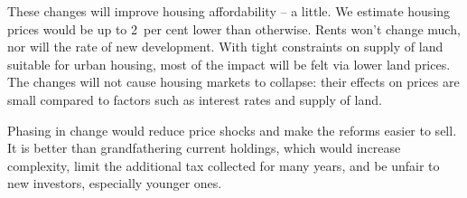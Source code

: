 \begin{overview}[-4\baselineskip]
These changes will improve housing affordability -- a little. We estimate housing prices would be up to 2~per cent lower than otherwise. Rents won't change much, nor will the rate of new development.  With tight constraints on supply of land suitable for urban housing, most of the impact will be felt via lower land prices. The changes will not cause housing markets to collapse: their effects on prices are small compared to factors such as interest rates and supply of land.

Phasing in change would reduce price shocks and make the reforms easier to sell. It is better than grandfathering current holdings, which would increase complexity, limit the additional tax collected for many years, and be unfair to new investors, especially younger ones.
\end{overview}
\addtolength{\columnsep}{-\overviewextra}
